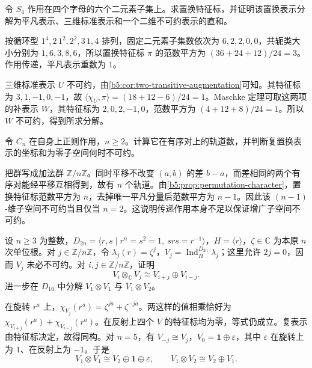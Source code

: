 \begin{exercise}\label{b5:ex:03-two-subsets-s4}
	令 \(S_4\) 作用在四个字母的六个二元素子集上。求置换特征标，并证明该置换表示分解为平凡表示、三维标准表示和一个二维不可约表示的直和。
\end{exercise}
\begin{solution}
	按循环型 \(1^4,2\,1^2,2^2,3\,1,4\) 排列，固定二元素子集数依次为 \(6,2,2,0,0\)，共轭类大小分别为 \(1,6,3,8,6\)，所以置换特征标 \(\pi\) 的范数平方为 \((36+24+12)/24=3\)。作用传递，平凡表示重数为 \(1\)。

	三维标准表示 \(U\) 不可约，由\cref{b5:cor:two-transitive-augmentation}可知。其特征标为 \(3,1,-1,0,-1\)，故 \(\langle\chi_U,\pi\rangle=(18+12-6)/24=1\)。Maschke 定理可取这两项的补表示 \(W\)，其特征标为 \(2,0,2,-1,0\)，范数平方为 \((4+12+8)/24=1\)。所以 \(W\) 不可约，得到所求分解。
\end{solution}

\begin{exercise}\label{b5:ex:03-regular-augmentation}
	令 \(C_n\) 在自身上正则作用，\(n\ge2\)。计算它在有序对上的轨道数，并判断复置换表示的坐标和为零子空间何时不可约。
\end{exercise}
\begin{solution}
	把群写成加法群 \(\mathbb Z/n\mathbb Z\)。同时平移不改变 \((a,b)\) 的差 \(b-a\)，而差相同的两个有序对能经平移互相得到，故有 \(n\) 个轨道。由\cref{b5:prop:permutation-character}，置换特征标范数平方为 \(n\)，去掉唯一平凡分量后范数平方为 \(n-1\)。因此该 \((n-1)\)-维子空间不可约当且仅当 \(n=2\)。这说明传递作用本身不足以保证增广子空间不可约。
\end{solution}

\begin{exercise}\label{b5:ex:03-dihedral-tensor}
	设 \(n\ge3\) 为整数，\(D_{2n}=\langle r,s\mid r^n=s^2=1,\ srs=r^{-1}\rangle\)，\(H=\langle r\rangle\)，\(\zeta\in\mathbb C\) 为本原 \(n\) 次单位根。对 \(j\in\mathbb Z/n\mathbb Z\)，令 \(\lambda_j(r)=\zeta^j\)，\(V_j=\operatorname{Ind}_H^{D_{2n}}\lambda_j\)；这里允许 \(2j=0\)，因而 \(V_j\) 未必不可约。对 \(i,j\in\mathbb Z/n\mathbb Z\)，证明
	\[
		V_i\otimes_{\mathbb C}V_j\cong V_{i+j}\oplus V_{i-j}.
	\]
	进一步在 \(D_{10}\) 中分解 \(V_1\otimes V_1\) 与 \(V_1\otimes V_2\)。
\end{exercise}
\begin{solution}
	在旋转 \(r^a\) 上，\(\chi_{V_j}(r^a)=\zeta^{ja}+\zeta^{-ja}\)。两这样的值相乘恰好为 \(\chi_{V_{i+j}}(r^a)+\chi_{V_{i-j}}(r^a)\)。在反射上四个 \(V\) 的特征标均为零，等式仍成立。复表示由特征标决定，故得同构。对 \(n=5\)，有 \(V_{-j}\cong V_j\)，\(V_0=\mathbf1\oplus\varepsilon\)，其中 \(\varepsilon\) 在旋转上为 \(1\)、在反射上为 \(-1\)。于是
	\[
		V_1\otimes V_1\cong V_2\oplus\mathbf1\oplus\varepsilon, \qquad V_1\otimes V_2\cong V_2\oplus V_1.
	\]
\end{solution}

